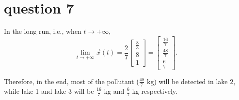 \documentclass[12pt,a4paper]{article}
\begin{document}
\section*{question 7}
\begin{solution}
In the long run, i.e., when $t\to +\infty$,
\[
\lim_{t\to +\infty}\vec{x}(t) = 
\frac{2}{7}\begin{bmatrix}\frac{8}{3}\\ 8\\ 1\end{bmatrix}
=
\left[\begin{array}{l}
\frac{16}{7} \\
\frac{48}{7} \\
\frac{6}{7}
\end{array}\right].
\]
\end{solution}

Therefore, in the end, most of the pollutant ($\frac{48}{7}$ kg) will be detected in lake 2, while lake 1 and lake 3 will be $\frac{16}{7}$ kg and $\frac{6}{7}$ kg respectively.
\end{document}

